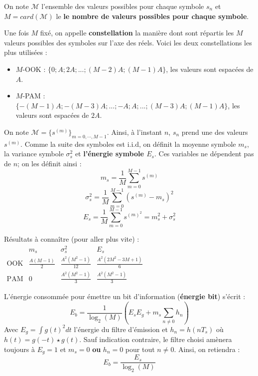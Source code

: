 	\begin{defn}
	On note \textbf{$\mathcal{M}$} l'ensemble des valeurs possibles pour chaque symbole $s_{n}$ et \textbf{$M = card(\mathcal{M})$} le \textbf{le nombre de valeurs possibles pour chaque symbole}.
	
	Une fois \textbf{$M$} fixé, on appelle \textbf{constellation} la manière dont sont répartis les \textbf{$M$} valeurs possibles des symboles sur l'axe des réels. Voici les deux constellations les plus utilisées :
	\begin{itemize}
	\item $M$-OOK : $\{0;A;2A;...;(M-2)A;(M-1)A\}$, les valeurs sont espacées de $A$.
	\item $M$-PAM : $\{-(M-1)A;-(M-3)A;...;-A;A;...;(M-3)A;(M-1)A\}$, les valeurs sont espacées de $2A$.
	\end{itemize}
	\end{defn}
	
	\begin{defn}
	On note \textbf{$\mathcal{M}=\{s^{(m)}\}_{m=0,\cdots,M-1}$}. Ainsi, à l'instant $n$, $s_{n}$ prend une des valeurs $s^{(m)}$.
	Comme la suite des symboles est i.i.d, on définit la moyenne symbole \textbf{$m_{s}$}, la variance symbole \textbf{$\sigma^{2}_{s}$} et \textbf{l'énergie symbole $E_{s}$}. Ces variables ne dépendent pas de $n$; on les définit ainsi :
	$$m_{s}=\frac{1}{M}\sum_{m=0}^{M-1}s^{(m)}$$
	$$\sigma^{2}_{s}=\frac{1}{M}\sum_{m=0}^{M-1}(s^{(m)}-m_{s})^2$$
	$$E_{s}=\frac{1}{M}\sum_{m=0}^{M-1}s^{(m)^2}=m_s^2+\sigma_s^2$$
	\end{defn}	
	
	\begin{pop}
		Résultats à connaître (pour aller plus vite) :
		$\begin{array}{c|ccc}
		           & m_s                & \sigma_s^2               & E_s \\ \hline
		\text{OOK} & \frac{A(M - 1)}{2} & \frac{A^2 (M^2 - 1)}{12} & \frac{A^2(2M^2 - 3M + 1)}{6} \\
		\text{PAM} & 0                  & \frac{A^2 (M^2 - 1)}{3}  & \frac{A^{2}(M^{2}-1)}{3}
		\end{array}$
	\end{pop}
	
	\begin{pop}
		L'énergie consommée pour émettre un bit d'information (\textbf{énergie bit}) s'écrit :
		$$E_b = \frac{1}{\log_{2}(M)} \left( E_{s}E_{g}+m_{s} \sum_{n\neq 0} h_{n} \right)$$
		Avec $E_g=\int g(t)^2dt$ l'énergie du filtre d'émission et $h_n=h(nT_s)$ où $h(t)=g(-t)\star g(t)$.
		Sauf indication contraire, le filtre choisi amènera toujours à $E_g=1$ et $m_s=0$ \textbf{ou} $h_n=0$ pour tout $n\neq 0$. Ainsi, on retiendra :
		$$E_b = \frac{E_s}{\log_2(M)}$$
	\end{pop}

